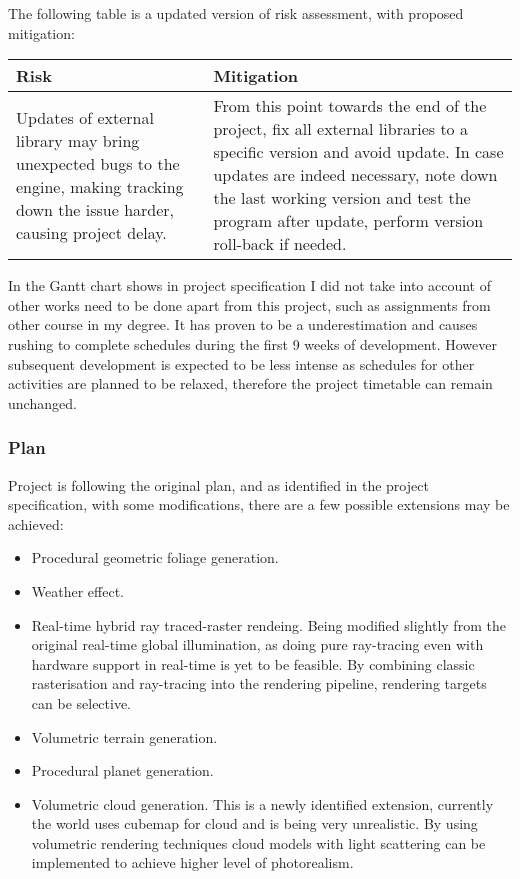 \documentclass[oneside, a4paper]{article}
\begin{document}
    The following table is a updated version of risk assessment, with proposed mitigation:

    \begin{center}
        \begin{tabular}{ | p{7.5cm} || p{7.5cm} | }
            \hline
            Risk & Mitigation \\
            \hline
            \hline
            Updates of external library may bring unexpected bugs to the engine, making tracking down the issue harder, causing project delay. &
            From this point towards the end of the project, fix all external libraries to a specific version and avoid update. In case updates are indeed necessary, note down the last working version and test the program after update, perform version roll-back if needed. \\
            \hline
        \end{tabular}
    \end{center}

    In the Gantt chart shows in project specification I did not take into account of other works need to be done apart from this project, such as assignments from other course in my degree. It has proven to be a underestimation and causes rushing to complete schedules during the first 9 weeks of development. However subsequent development is expected to be less intense as schedules for other activities are planned to be relaxed, therefore the project timetable can remain unchanged.


    \subsubsection{Plan}

    Project is following the original plan, and as identified in the project specification, with some modifications, there are a few possible extensions may be achieved:

    \begin{itemize}[label=\(\diamond\)]
        \item Procedural geometric foliage generation.
        \item Weather effect.
        \item Real-time hybrid ray traced-raster rendeing. Being modified slightly from the original real-time global illumination, as doing pure ray-tracing even with hardware support in real-time is yet to be feasible. By combining classic rasterisation and ray-tracing into the rendering pipeline, rendering targets can be selective.
        \item Volumetric terrain generation.
        \item Procedural planet generation.
        \item Volumetric cloud generation. This is a newly identified extension, currently the world uses cubemap for cloud and is being very unrealistic. By using volumetric rendering techniques cloud models with light scattering can be implemented to achieve higher level of photorealism.
    \end{itemize}
\end{document}
